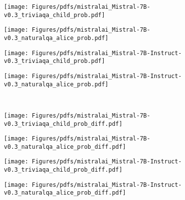 \begin{figure*}[t]
\centering
 \centering

 \centering
\begin{subfigure}[b]{0.24\textwidth}
  \centering
  \texttt{[image: Figures/pdfs/mistralai\_Mistral-7B-v0.3\_triviaqa\_child\_prob.pdf]}
 \end{subfigure}%
 \hfill
 \begin{subfigure}[b]{0.24\textwidth}
  \centering
\texttt{[image: Figures/pdfs/mistralai\_Mistral-7B-v0.3\_naturalqa\_alice\_prob.pdf]}
\end{subfigure}
\hfill
\begin{subfigure}[b]{0.24\textwidth}
  \centering
  \texttt{[image: Figures/pdfs/mistralai\_Mistral-7B-Instruct-v0.3\_triviaqa\_child\_prob.pdf]}
 \end{subfigure}
 \hfill
 \begin{subfigure}[b]{0.24\textwidth}
  \centering
  \texttt{[image: Figures/pdfs/mistralai\_Mistral-7B-Instruct-v0.3\_naturalqa\_alice\_prob.pdf]}
 \end{subfigure}\\

 \centering
\begin{subfigure}[b]{0.24\textwidth}
  \centering
  \texttt{[image: Figures/pdfs/mistralai\_Mistral-7B-v0.3\_triviaqa\_child\_prob\_diff.pdf]}
 \end{subfigure}%
 \hfill
 \centering
\begin{subfigure}[b]{0.24\textwidth}
  \centering
  \texttt{[image: Figures/pdfs/mistralai\_Mistral-7B-v0.3\_naturalqa\_alice\_prob\_diff.pdf]}
 \end{subfigure}%
 \hfill
\begin{subfigure}[b]{0.24\textwidth}
  \centering
  \texttt{[image: Figures/pdfs/mistralai\_Mistral-7B-Instruct-v0.3\_triviaqa\_child\_prob\_diff.pdf]}
 \end{subfigure}
 \hfill
 \begin{subfigure}[b]{0.24\textwidth}
  \centering
  \texttt{[image: Figures/pdfs/mistralai\_Mistral-7B-Instruct-v0.3\_naturalqa\_alice\_prob\_diff.pdf]}
 \end{subfigure}\\


\end{figure*}
